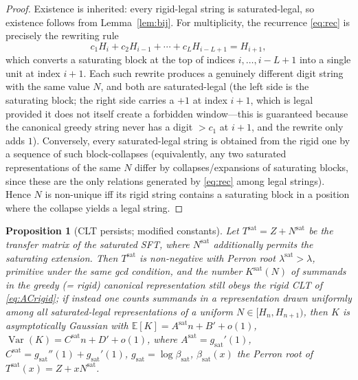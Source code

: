 \documentclass[12pt]{article}
\newtheorem{proposition}{Proposition}
\theoremstyle{definition}
\DeclareMathOperator{\Var}{Var}
\newcommand{\E}{\mathbb{E}}
\begin{document}
\begin{proof}
Existence is inherited: every rigid-legal string is saturated-legal, so existence
follows from Lemma~\ref{lem:bij}. For multiplicity, the recurrence
\eqref{eq:rec} is precisely the rewriting rule
\[
c_1H_i+c_2H_{i-1}+\cdots+c_LH_{i-L+1}=H_{i+1},
\]
which converts a saturating block at the top of indices $i,\dots,i-L+1$ into a
single unit at index $i+1$. Each such rewrite produces a genuinely different
digit string with the same value $N$, and both are saturated-legal (the left
side is the saturating block; the right side carries a $+1$ at index $i+1$,
which is legal provided it does not itself create a forbidden window---this is
guaranteed because the canonical greedy string never has a digit $>c_1$ at
$i+1$, and the rewrite only adds $1$). Conversely, every saturated-legal string
is obtained from the rigid one by a sequence of such block-collapses
(equivalently, any two saturated representations of the same $N$ differ by
collapses/expansions of saturating blocks, since these are the only relations
generated by \eqref{eq:rec} among legal strings). Hence $N$ is non-unique iff
its rigid string contains a saturating block in a position where the collapse
yields a legal string.
\end{proof}

\begin{proposition}[CLT persists; modified constants]\label{prop:cltI}
Let $T^{\mathrm{sat}}=Z+N^{\mathrm{sat}}$ be the transfer matrix of the
saturated SFT, where $N^{\mathrm{sat}}$ additionally permits the saturating
extension. Then $T^{\mathrm{sat}}$ is non-negative with Perron root
$\lambda^{\mathrm{sat}}>\lambda$, primitive under the same gcd condition, and the
number $K^{\mathrm{sat}}(N)$ of summands in the \emph{greedy} (= rigid) canonical
representation still obeys the rigid CLT of \eqref{eq:ACrigid}; if instead one
counts summands in a representation drawn uniformly among all saturated-legal
representations of a uniform $N\in[H_n,H_{n+1})$, then $K$ is asymptotically
Gaussian with $\E[K]=A^{\mathrm{sat}}n+B'+o(1)$,
$\Var(K)=C^{\mathrm{sat}}n+D'+o(1)$, where $A^{\mathrm{sat}}=g_{\mathrm{sat}}'(1)$,
$C^{\mathrm{sat}}=g_{\mathrm{sat}}''(1)+g_{\mathrm{sat}}'(1)$,
$g_{\mathrm{sat}}=\log\beta_{\mathrm{sat}}$, $\beta_{\mathrm{sat}}(x)$ the Perron
root of $T^{\mathrm{sat}}(x)=Z+xN^{\mathrm{sat}}$.
\end{proposition}
\end{document}
